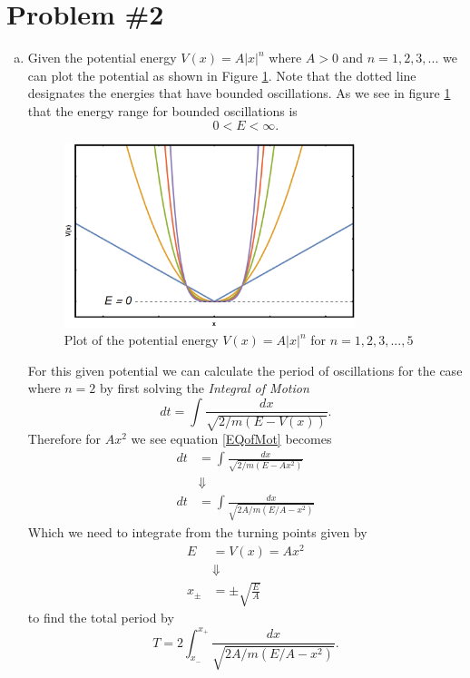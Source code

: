 \documentclass[11pt]{article}
\numberwithin{equation}{section}
\begin{document}
\section{Problem \#2}
\begin{enumerate}[(a)]

\item Given the potential energy $V(x) = A|x|^n$ where $A>0$ and $n=1,2,3,...$ we can plot
the potential as shown in Figure \ref{Prob2a}. Note that the dotted line designates the 
energies that have bounded oscillations. As we see in figure \ref{Prob2a} that the energy 
range for bounded oscillations is
$$0<E<\infty.$$
\begin{figure}
\centering
\includegraphics[width=0.8\textwidth,keepaspectratio]{Images/Problem2a.png}
\caption{Plot of the potential energy $V(x) = A|x|^n$ for $n=1,2,3,...,5$}
\label{Prob2a}
\end{figure}
For this given potential we can calculate the period of oscillations for the case where 
$n=2$ by first solving the \emph{Integral of Motion}
\begin{equation}
dt = \int\frac{dx}{\sqrt{2/m(E-V(x))}}.
\label{EQofMot}
\end{equation}
Therefore for $Ax^2$ we see equation \ref{EQofMot} becomes
\begin{align*}
dt &= \int\frac{dx}{\sqrt{2/m(E-Ax^2)}}\\
&\Downarrow\\
dt &= \int\frac{dx}{\sqrt{2A/m(E/A-x^2)}}
\end{align*}
Which we need to integrate from the turning points given by
\begin{align*}
E &= V(x) = Ax^2\\
&\Downarrow\\
x_{\pm} &= \pm\sqrt{\frac{E}{A}}
\end{align*}
to find the total period by
$$T = 2\int_{x_-}^{x_+}\frac{dx}{\sqrt{2A/m(E/A-x^2)}}.$$

\end{enumerate}
\end{document}
